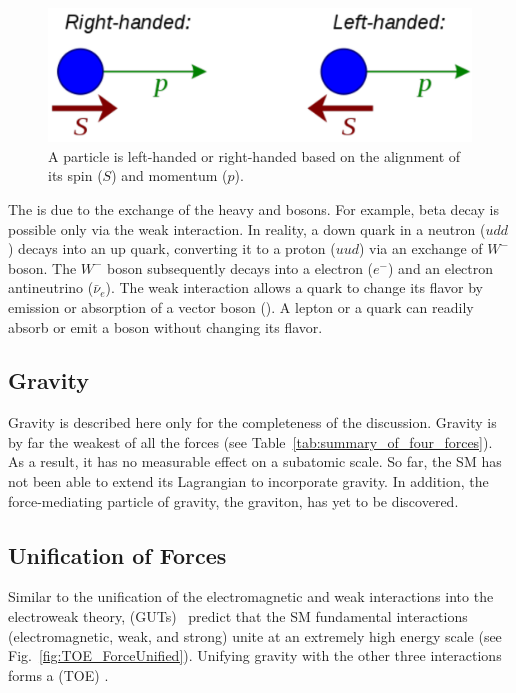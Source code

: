 \begin{figure}[h!]
\vspace{3ex}
 \centering
 \includegraphics[scale=0.8,keepaspectratio=true]{./Helicity.pdf}
 \caption{A particle is left-handed or right-handed based on the alignment of its spin ($S$) and momentum ($p$).}
 \label{fig:Helicity}
\end{figure}

The  is due to the exchange of the heavy \W and \Z bosons. For example, beta decay is possible only via the weak interaction. In reality, a down quark in a neutron ($udd$) decays into an up quark, converting it to a proton ($uud$) via an exchange of $W^{-}$ boson. The $W^{-}$ boson subsequently decays into a electron ($e^{-}$) and an electron antineutrino ($\bar\nu_{e}$). The weak interaction allows a quark to change its flavor by emission or absorption of a vector boson (\W). A lepton or a quark can readily absorb or emit a \Z boson without changing its flavor.

\subsection{Gravity}
Gravity is described here only for the completeness of the discussion. Gravity is by far the weakest of all the forces (see Table~\ref{tab:summary_of_four_forces}). As a result, it has no measurable effect on a subatomic scale. So far, the SM has not been able to extend its Lagrangian to incorporate gravity. In addition, the force-mediating particle of gravity, the graviton, has yet to be discovered.

\subsection{Unification of Forces}
Similar to the unification of the electromagnetic and weak interactions into the electroweak theory,  (GUTs)~\cite{pap:GUTtheory} predict that the SM fundamental interactions (electromagnetic, weak, and strong) unite at an extremely high energy scale (see Fig.~\ref{fig:TOE_ForceUnified}). Unifying gravity with the other three interactions forms a  (TOE) \cite{pap:TOE}.

